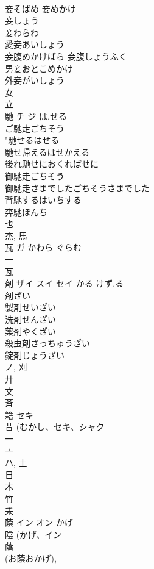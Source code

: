 \documentclass[8pt]{extreport}
\begin{document}
\begin{CJK}{UTF8}{min}
\\	妾そばめ 妾めかけ 
\\	妾しょう 
\\	妾わらわ 
\\	愛妾あいしょう 
\\	妾腹めかけばら 妾腹しょうふく 
\\	男妾おとこめかけ 
\\	外妾がいしょう 
\\	女 
\\	立 
\\	馳	チ ジ	は.せる	
\\	ご馳走ごちそう 
\\	"馳せるはせる 
\\	馳せ帰えるはせかえる 
\\	後れ馳せにおくればせに 
\\	御馳走ごちそう 
\\	御馳走さまでしたごちそうさまでした 
\\	背馳するはいちする 
\\	奔馳ほんち 
\\	也 
\\	杰, 馬 
\\	瓦	ガ	かわら ぐらむ	
\\	一 
\\	瓦 
\\	剤	ザイ スイ セイ	かる けず.る	
\\	剤ざい 
\\	製剤せいざい 
\\	洗剤せんざい 
\\	薬剤やくざい 
\\	殺虫剤さっちゅうざい 
\\	錠剤じょうざい 
\\	ノ, 刈 
\\	廾 
\\	文 
\\	斉 
\\	籍	セキ		
\\	昔 (むかし、セキ、シャク 
\\	一 
\\	亠 
\\	ハ, 土 
\\	日 
\\	木 
\\	竹 
\\	耒 
\\	蔭	イン オン	かげ	
\\	陰 (かげ、イン 
\\	蔭 
\\	(お蔭おかげ), 

\end{CJK}
\end{document}
